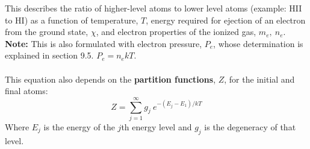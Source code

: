 This describes the ratio of higher-level atoms to lower level atoms (example: HII to HI) as a function of temperature, $ T $, energy required for ejection of an electron from the ground state, $ \chi $, and electron properties of the ionized gas, $ m_{e},~n_{e} $.\\
\textbf{Note: }This is also formulated with electron pressure, $ P_{e} $, whose determination is explained in section 9.5. $ P_{e}=n_{e}kT $. \\\\
This equation also depends on the \textbf{partition functions}, $ Z $, for the initial and final atoms:
\begin{equation}
  \label{partition-functions}
  Z=\sum_{j=1}^{\infty}g_{j}~e^{-(E_{j}-E_{1})/kT}
\end{equation}
Where $ E_{j} $ is the energy of the $ j $th energy level and $ g_{j} $ is the degeneracy of that level.




